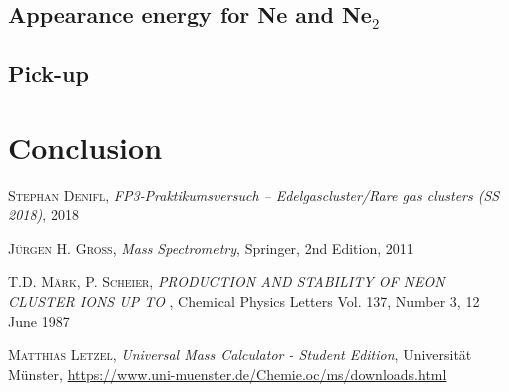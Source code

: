 \documentclass[a4paper,10pt]{article}
\begin{document}
\subsection{Appearance energy for Ne and Ne$_2$}
\subsection{Pick-up}
\section{Conclusion}

\begin{thebibliography}{99}

\textsc{Stephan Denifl}, \textit{FP3‐Praktikumsversuch – Edelgascluster/Rare gas clusters (SS 2018)}, 2018

\textsc{Jürgen H. Gross}, \textit{Mass Spectrometry}, Springer, 2nd Edition, 2011

\textsc{T.D. Märk, P. Scheier}, \textit{PRODUCTION AND STABILITY OF NEON CLUSTER IONS UP TO }, Chemical Physics Letters Vol. 137, Number 3, 12 June 1987

\textsc{Matthias Letzel}, \textit{Universal Mass Calculator - Student Edition}, Universität Münster, \url{https://www.uni-muenster.de/Chemie.oc/ms/downloads.html}


\end{thebibliography}
\end{document}
